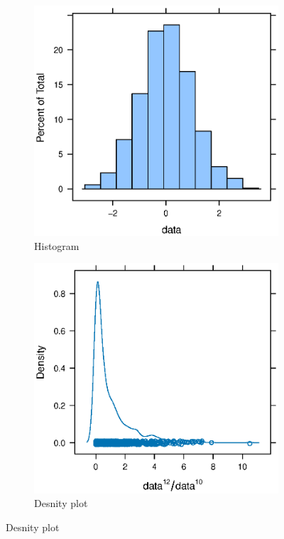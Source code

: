 \documentclass[10pt, a4paper, titlepage]{article}
\begin{document}
\begin{figure}[hbt!]
\begin{subfigure}{.4\linewidth}
  \includegraphics[width=\linewidth]{plot1.eps}
  \caption{Histogram}
  \label{plot1}
\end{subfigure}\hfill %
\begin{subfigure}{.4\linewidth}
  \includegraphics[width=\linewidth]{plot2.eps}
  \caption{Desnity plot}
  \label{plot2}
\end{subfigure}\bigskip %


\end{figure}
\end{document}
